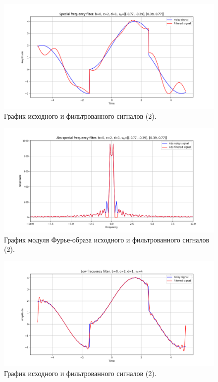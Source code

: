 \documentclass[a4paper, 12pt]{article}
\begin{document}
    \begin{figure}[!htb]
        \centering
        \includegraphics[scale=0.48]{2_u_flt_u_nospec.png}
        \captionsetup{skip=0pt}
        \caption{График исходного и фильтрованного сигналов (2).}
        \label{fig:fig81}
    \end{figure}
    \begin{figure}[!htb]
        \centering
        \includegraphics[scale=0.48]{2_abs_u_U_nospec.png}
        \captionsetup{skip=0pt}
        \caption{График модуля Фурье-образа исходного и фильтрованного сигналов (2).}
        \label{fig:fig82}
    \end{figure}
    \begin{figure}[!htb]
        \centering
        \includegraphics[scale=0.48]{2_1_u_flt_u_nospec.png}
        \captionsetup{skip=0pt}
        \caption{График исходного и фильтрованного сигналов (2).}
        \label{fig:fig83}
    \end{figure}
\end{document}
